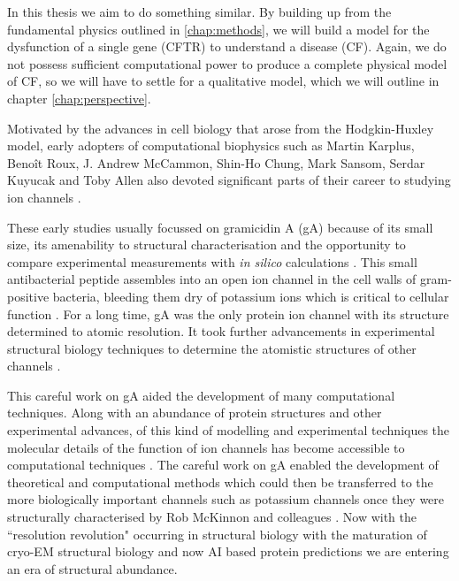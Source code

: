 In this thesis we aim to do something similar. By building up from the fundamental physics outlined in \ref{chap:methods}, we will build a model for the dysfunction of a single gene (CFTR) to understand a disease (CF). Again, we do not possess sufficient computational power to produce a complete physical model of CF, so we will have to settle for a qualitative model, which we will outline in chapter \ref{chap:perspective}. 

Motivated by the advances in cell biology that arose from the Hodgkin-Huxley model, early adopters of computational biophysics such as Martin Karplus, Beno\^it Roux, J. Andrew McCammon, Shin-Ho Chung, Mark Sansom, Serdar Kuyucak and Toby Allen also devoted significant parts of their career to studying ion channels \cite{mccammon1977, sansom1991, roux1991, roux1993, sansom1991, allen2003, allen2004, chung2002, tieleman2001}. 

These early studies usually focussed on gramicidin A (gA) because of its small size, its amenability to structural characterisation and the opportunity to compare experimental measurements with \textit{in silico} calculations \cite{urry1971,arseniev1985,wallace1986,wallace1998}. This small antibacterial peptide assembles into an open ion channel in the cell walls of gram-positive bacteria, bleeding them dry of potassium ions which is critical to cellular function \cite{liou2015}. For a long time, gA was the only protein ion channel with its structure determined to atomic resolution. It took further advancements in experimental structural biology techniques to determine the atomistic structures of other channels \cite{kuhlbrandt2014, }. 


This careful work on gA aided the development of many computational techniques. Along with an abundance of protein structures and other experimental advances, of this kind of modelling and experimental techniques the molecular details of the function of ion channels has become accessible to computational techniques \cite{flood2019}. The careful work on gA enabled the development of theoretical and computational methods which could then be transferred to the more biologically important channels such as potassium channels once they were structurally characterised by Rob McKinnon and colleagues \cite{rashid2013, li2021, vandenberg2021}. Now with the ``resolution revolution" occurring in structural biology with the maturation of cryo-EM structural biology and now AI based protein predictions we are entering an era of structural abundance. 


